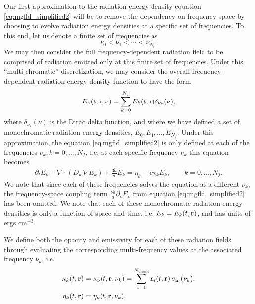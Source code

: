 \documentclass[10pt]{article}
\renewcommand{\(}{\left(}
\renewcommand{\)}{\right)}
\newcommand{\rvec}{{\bf r}}
\newcommand{\adot}{\dot{a}}
\newcommand{\Enu}{E_{\nu}}
\newcommand{\mn}{{\tt n}}
\begin{document}
Our first approximation to the radiation energy density equation
\eqref{eq:mgfld_simplified2} will be to remove the dependency on
frequency space by choosing to evolve radiation energy densities at a
specific set of frequencies.  To this end, let us denote a finite set
of frequencies as
\begin{equation}
\label{eq:monochromatic_frequencies}
  \nu_0 < \nu_1 < \cdots < \nu_{N_f}.
\end{equation}
We may then consider the full frequency-dependent radiation field to
be comprised of radiation emitted only at this finite set of
frequencies.  Under this ``multi-chromatic'' discretization, we may
consider the overall frequency-dependent radiation energy density
function to have the form 
\begin{equation}
\label{eq:radiation_multichromatic}
  \Enu(t,\rvec,\nu) = \sum_{k=0}^{N_f} E_{k}(t,\rvec) \delta_{\nu_k}(\nu),
\end{equation}
where $\delta_{\nu_k}(\nu)$ is the Dirac delta function, and where we
have defined a set of monochromatic radiation energy densities, $E_0,
E_1, \ldots, E_{N_f}$.  Under this approximation, the equation
\eqref{eq:mgfld_simplified2} is only defined at each of the
frequencies $\nu_k, k=0,\ldots,N_f$, i.e. at each specific frequency
$\nu_k$ this equation becomes
\begin{align}
  \label{eq:mgfld_multichromatic}
  \partial_{t} E_k - \nabla\cdot(D_k\,\nabla E_k) + \frac{3 \adot}{a}
  E_k = \eta_k - c \kappa_k E_k, \qquad k=0,\ldots,N_f.
\end{align}
We note that since each of these frequencies solves the equation at a
different $\nu_k$, the frequency-space coupling term 
$\frac{\nu \adot}{a}\partial_{\nu}\Enu$ from equation
\eqref{eq:mgfld_simplified2} has been omitted.
We note that each of these monochromatic radiation energy densities is
only a function of space and time, i.e. $E_k = E_k(t,\rvec)$, and
has units of ergs cm$^{-3}$.

We define both the opacity and emissivity for each of these radiation
fields through evaluating the corresponding multi-frequency values at
the associated frequency $\nu_k$, i.e.
\begin{align}
\label{eq:opacity_multichromatic}
  \kappa_k(t,\rvec) &= \kappa_{\nu}(t,\rvec,\nu_k) = \sum_{i=1}^{N_\text{chem}} \mn_i(t,\rvec)\, \sigma_{\mn_i} (\nu_k), \\
\label{eq:emissivity_multichromatic}
  \eta_k(t,\rvec) &= \eta_{\nu}(t,\rvec,\nu_k).
\end{align}
\end{document}
